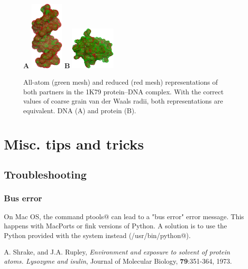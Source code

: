 \documentclass[12pt,a4paper]{article}
\begin{document}
\begin{figure}[htbp]
\center
{\textbf A}
\includegraphics*[width=0.15\textwidth]{img/1K79_dna.png}
\hspace*{2cm}
{\textbf B}
\includegraphics*[width=0.20\textwidth]{img/1K79_prot.png}
\caption{All-atom (green mesh) and reduced (red mesh) representations of both 
partners in the 1K79 protein--DNA complex. With the correct values of coarse grain
van der Waals radii, both representations are equivalent.
DNA (A) and protein (B).}
\label{real_vdw}
\end{figure}

\section{Misc. tips and tricks}


\subsection{Troubleshooting}

\subsubsection{Bus error}

On Mac OS, the command \verb@import ptools@ can lead to a "bus error" 
error message. This happens with MacPorts or fink versions of Python. 
A solution is to use the Python provided with the system instead 
(\verb@/usr/bin/python@).



\begin{thebibliography}{99}

 A. Shrake, and J.A. Rupley, 
{\it Environment and exposure to solvent of protein atoms. Lysozyme and
isulin}, 
Journal of Molecular Biology, {\bf 79}:351-364, 1973.

\end{thebibliography}
\end{document}
